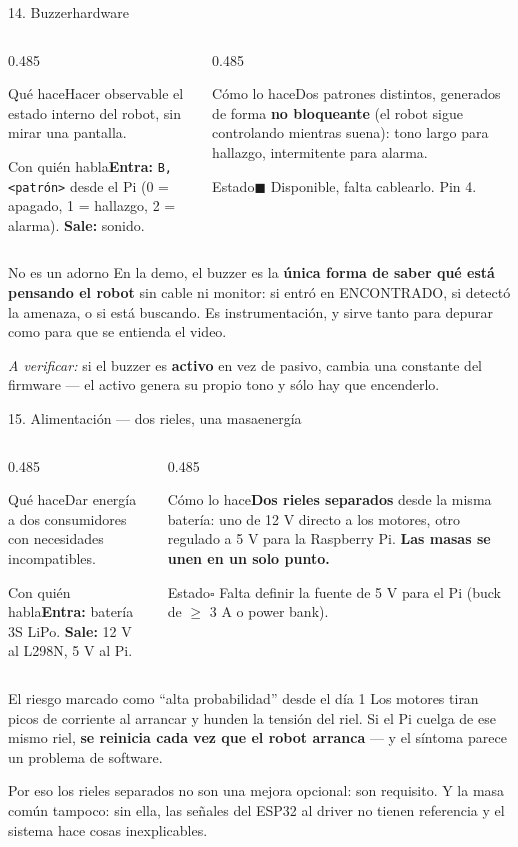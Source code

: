 \documentclass[aspectratio=169,10pt]{beamer}
\newcommand{\curso}{\textcolor{ambar}{$\blacksquare$}}
\newcommand{\pend}{\textcolor{grisclaro}{$\square$}}
\newcommand{\ficha}[4]{%
  {\footnotesize
  \begin{columns}[T,onlytextwidth]
    \begin{column}{0.485\textwidth}
      \begin{block}{Qué hace}#1\end{block}
      \begin{block}{Con quién habla}#3\end{block}
    \end{column}
    \begin{column}{0.485\textwidth}
      \begin{block}{Cómo lo hace}#2\end{block}
      \begin{block}{Estado}#4\end{block}
    \end{column}
  \end{columns}}}
\begin{document}
\begin{frame}{14. Buzzer\hfill{\small\mdseries hardware}}
  \ficha
  {Hacer observable el estado interno del robot, sin mirar una pantalla.}
  {Dos patrones distintos, generados de forma \textbf{no bloqueante} (el robot
   sigue controlando mientras suena): tono largo para hallazgo, intermitente
   para alarma.}
  {\textbf{Entra:} \texttt{B,<patrón>} desde el Pi (0 = apagado, 1 = hallazgo,
   2 = alarma). \textbf{Sale:} sonido.}
  {\curso{} Disponible, falta cablearlo. Pin 4.}

  \vspace{0.5em}
  \begin{block}{No es un adorno}
    \small
    En la demo, el buzzer es la \textbf{única forma de saber qué está pensando el
    robot} sin cable ni monitor: si entró en ENCONTRADO, si detectó la amenaza,
    o si está buscando. Es instrumentación, y sirve tanto para depurar como para
    que se entienda el video.
    \vspace{0.3em}

    \emph{A verificar:} si el buzzer es \textbf{activo} en vez de pasivo, cambia
    una constante del firmware --- el activo genera su propio tono y sólo hay que
    encenderlo.
  \end{block}
\end{frame}

\begin{frame}{15. Alimentación --- dos rieles, una masa\hfill{\small\mdseries energía}}
  \ficha
  {Dar energía a dos consumidores con necesidades incompatibles.}
  {\textbf{Dos rieles separados} desde la misma batería: uno de 12 V directo a
   los motores, otro regulado a 5 V para la Raspberry Pi. \textbf{Las masas se
   unen en un solo punto.}}
  {\textbf{Entra:} batería 3S LiPo. \textbf{Sale:} 12 V al L298N, 5 V al Pi.}
  {\pend{} Falta definir la fuente de 5 V para el Pi (buck de $\geq$ 3 A o
   power bank).}

  \vspace{0.4em}
  \begin{alertblock}{El riesgo marcado como ``alta probabilidad'' desde el día 1}
    \small
    Los motores tiran picos de corriente al arrancar y hunden la tensión del
    riel. Si el Pi cuelga de ese mismo riel, \textbf{se reinicia cada vez que el
    robot arranca} --- y el síntoma parece un problema de software.
    \vspace{0.3em}

    Por eso los rieles separados no son una mejora opcional: son requisito. Y la
    masa común tampoco: sin ella, las señales del ESP32 al driver no tienen
    referencia y el sistema hace cosas inexplicables.
  \end{alertblock}
\end{frame}
\end{document}
